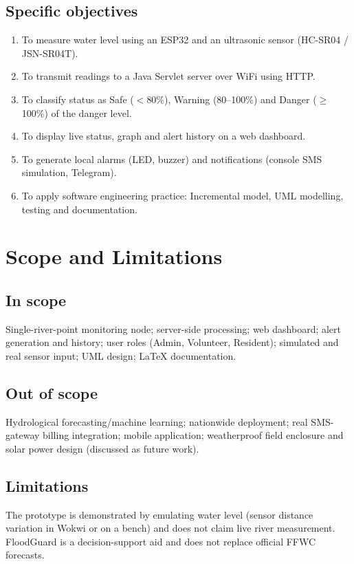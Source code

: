 \documentclass[12pt,a4paper]{article}
\begin{document}
\subsection{Specific objectives}
\begin{enumerate}[noitemsep]
\item To measure water level using an ESP32 and an ultrasonic sensor (HC-SR04 / JSN-SR04T).
\item To transmit readings to a Java Servlet server over WiFi using HTTP.
\item To classify status as Safe ($<$80\%), Warning (80--100\%) and Danger ($\ge$100\%) of the danger level.
\item To display live status, graph and alert history on a web dashboard.
\item To generate local alarms (LED, buzzer) and notifications (console SMS simulation, Telegram).
\item To apply software engineering practice: Incremental model, UML modelling, testing and documentation.
\end{enumerate}

\section{Scope and Limitations}
\subsection{In scope}
Single-river-point monitoring node; server-side processing; web dashboard; alert generation and history; user roles (Admin, Volunteer, Resident); simulated and real sensor input; UML design; LaTeX documentation.
\subsection{Out of scope}
Hydrological forecasting/machine learning; nationwide deployment; real SMS-gateway billing integration; mobile application; weatherproof field enclosure and solar power design (discussed as future work).
\subsection{Limitations}
The prototype is demonstrated by emulating water level (sensor distance variation in Wokwi or on a bench) and does not claim live river measurement. FloodGuard is a decision-support aid and does not replace official FFWC forecasts.

\end{document}
